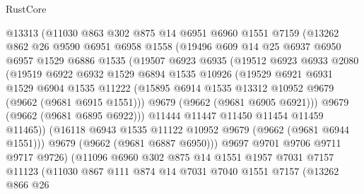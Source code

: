 \begin{lexlean}{RustCore}
\begin{coremodule}
              @13313
              (@11030
                @863
                @302
                @875
                @14
                @6951
                @6960
                @1551
                @7159
                (@13262
                  @862
                  @26
                  @9590
                  @6951
                  @6958
                  @1558
                  (@19496
                    @609
                    @14
                    @25
                    @6937
                    @6950
                    @6957
                    @1529
                    @6886
                    @1535
                    (@19507
                      @6923
                      @6935
                      (@19512
                        @6923
                        @6933
                        @2080
                        (@19519
                          @6922
                          @6932
                          @1529
                          @6894
                          @1535
                          @10926
                          (@19529
                            @6921
                            @6931
                            @1529
                            @6904
                            @1535
                            @11222
                            (@15895 @6914 @1535 @13312 @10952 @9679 (@9662 (@9681 @6915 @1551)))
                            @9679
                            (@9662 (@9681 @6905 @6921)))
                          @9679
                          (@9662 (@9681 @6895 @6922)))
                        @11444
                        @11447
                        @11450
                        @11454
                        @11459
                        @11465))
                    (@16118 @6943 @1535 @11122 @10952 @9679 (@9662 (@9681 @6944 @1551)))
                    @9679
                    (@9662 (@9681 @6887 @6950)))
                  @9697
                  @9701
                  @9706
                  @9711
                  @9717
                  @9726)
                (@11096
                  @6960
                  @302
                  @875
                  @14
                  @1551
                  @1957
                  @7031
                  @7157
                  @11123
                  (@11030
                    @867
                    @111
                    @874
                    @14
                    @7031
                    @7040
                    @1551
                    @7157
                    (@13262
                      @866
                      @26

\end{coremodule}
\end{lexlean}
